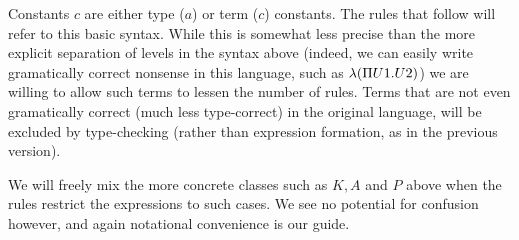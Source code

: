 Constants $c$ are either type ($a$) or term ($c$) constants.
The rules that follow will refer to this basic syntax.  While this
is somewhat less precise than the more explicit separation of 
levels in the syntax above (indeed, we can easily write gramatically
correct nonsense in this language, such as $\lambda (\Pi U1.U2)$)
we are willing to allow such terms to lessen the number of rules.
Terms that are not even gramatically correct (much less type-correct) 
in the original language, will be excluded by type-checking (rather than expression 
formation, as in the previous version).

We will freely mix the more concrete classes such as $K,A$ and $P$
above when the rules restrict the expressions to such cases.
We see no potential for confusion however, and again notational
convenience is our guide.  


